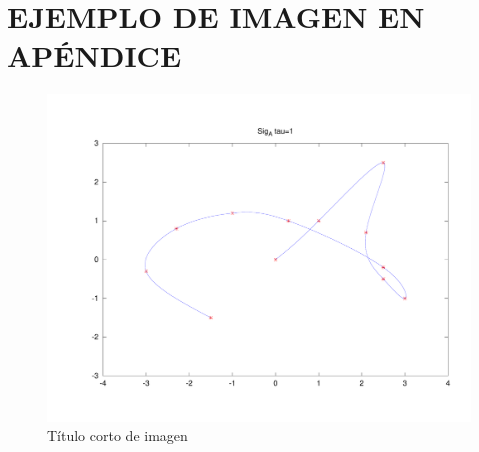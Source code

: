 \chapter{EJEMPLO DE IMAGEN EN APÉNDICE}\label{apx:img}
\begin{figure}[ht]
\includegraphics[scale=0.48,angle=0]{ejemplo}
\caption[Título corto de imagen]{Título corto de imagen}\label{img:imgscl}
\end{figure}


